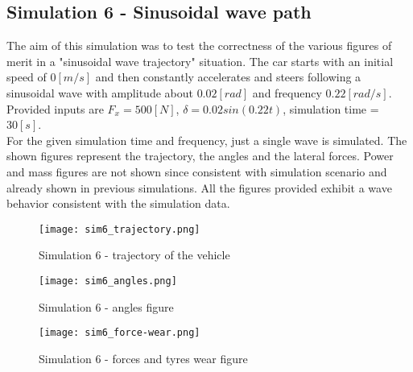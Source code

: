 \documentclass{report}
\let\Oldsubsection\subsection
\renewcommand{\subsection}{\FloatBarrier\Oldsubsection}
\begin{document}
\subsection{Simulation 6 - Sinusoidal wave path}
The aim of this simulation was to test the correctness of the various figures of merit in a "sinusoidal wave trajectory" situation. The car starts with an initial speed of $0[m/s]$ and then constantly accelerates and steers following a sinusoidal wave with amplitude about $0.02[rad]$ and frequency $0.22[rad/s]$. Provided inputs are $F_x = 500 [N]$, $\delta = 0.02sin(0.22t)$, simulation time = $30 [s]$. \\For the given simulation time and frequency, just a single wave is simulated. The shown figures represent the trajectory, the angles and the lateral forces. Power and mass figures are not shown since consistent with simulation scenario and already shown in previous simulations. All the figures provided exhibit a wave behavior consistent with the simulation data.  
\begin{figure}[h!]
    \centering
    \texttt{[image: sim6\_trajectory.png]}
    \caption{Simulation 6 - trajectory of the vehicle}
    \label{fig:sim6_1}
\end{figure}
\begin{figure}[h!]
    \centering
    \texttt{[image: sim6\_angles.png]}
    \caption{Simulation 6 - angles figure}
    \label{fig:sim6_2}
\end{figure}
\begin{figure}[h!]
    \centering
    \texttt{[image: sim6\_force-wear.png]}
    \caption{Simulation 6 - forces and tyres wear figure}
    \label{fig:sim6_3}
\end{figure}
\end{document}
